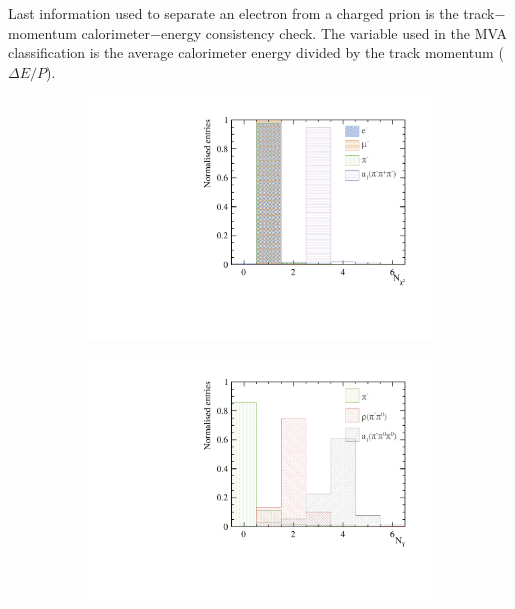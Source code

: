 Last information used to separate an electron  from a charged prion is the track$-$momentum calorimeter$-$energy consistency check. The variable used in the MVA classification is the average calorimeter energy divided by the track momentum ($\Delta E/P$).








\begin{figure}[htbp]
\centering
\begin{subfigure}[b]{0.45\textwidth}
 \includegraphics[width=\textwidth]{tau/var2/nCharge_100GeV_improved.pdf}
  \caption{}
  \label{fig:tauVarNCharge}
\end{subfigure}
\begin{subfigure}[b]{0.45\textwidth}
 \includegraphics[width=\textwidth]{tau/var2/nPhoton_100GeV_improved.pdf}

\end{subfigure}
\end{figure}
